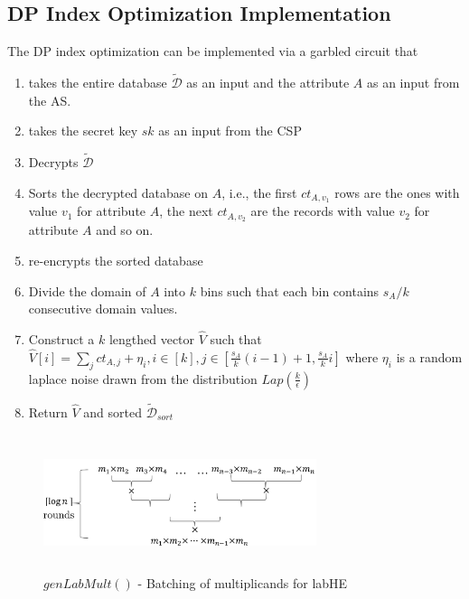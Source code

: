  \subsection{DP Index Optimization Implementation}\label{index-imp}
 The DP index optimization can be implemented via a garbled circuit that \begin{enumerate}\item takes the entire database $\boldsymbol{\mathcal{\tilde{D}}}$ as an input and the attribute $A$ as an input from the \textsf{AS}.
\item takes the secret key $sk$ as an input from  the \textsf{CSP} \item Decrypts $\boldsymbol{\mathcal{\tilde{D}}}$ \item Sorts the decrypted database on $A$, i.e., the first $ct_{A,v_1}$ rows are the ones with value $v_1$ for attribute $A$, the next $ct_{A,v_2}$ are  the records with value $v_2$ for attribute $A$ and so on. \item  re-encrypts the sorted database \item Divide the domain of $A$ into $k$ bins such that each bin contains $s_A/k$ consecutive domain values. \item Construct a $k$ lengthed vector $\hat{V}$ such that $\hat{V}[i]=\sum_jct_{A,j}+\eta_i, i \in [k], j \in [\frac{s_A}{k}(i-1)+1,\frac{s_A}{k}i]$ where $\eta_i$ is a random laplace noise drawn from the distribution $Lap(\frac{k}{\epsilon})$ \item Return $\hat{V}$ and sorted $\boldsymbol{\mathcal{\tilde{D}}}_{sort}$\end{enumerate}
\begin{figure}\includegraphics[height=4cm,width=8cm]{kk.png} \caption{ $genLabMult()$ - Batching of multiplicands for \textsf{labHE}} \label{genlab-fig}\end{figure}